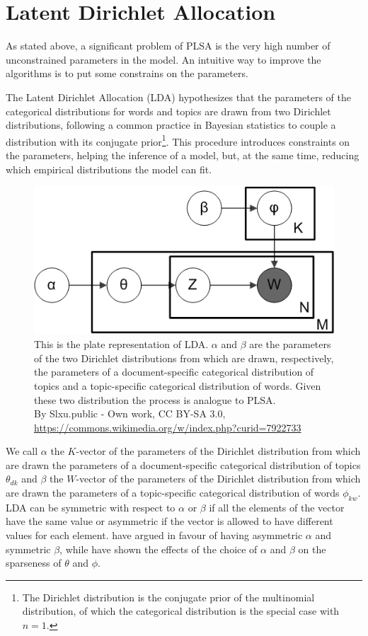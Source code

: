 \documentclass[11pt, a4paper, oneside, openright]{book}
\begin{document}
\section{Latent Dirichlet Allocation}
\label{sec:lda}
As stated above, a significant problem of PLSA is the very high number of unconstrained parameters in the model. An intuitive way to improve the algorithms is to put some constrains on the parameters.

The Latent Dirichlet Allocation (LDA) \parencite{blei2003} hypothesizes that the parameters of the categorical distributions for words and topics are drawn from two Dirichlet distributions, following a common practice in Bayesian statistics to couple a distribution with its conjugate prior\footnote{The Dirichlet distribution is the conjugate prior of the multinomial distribution, of which the categorical distribution is the special case with $n=1$.}. This procedure introduces constraints on the parameters, helping the inference of a model, but, at the same time, reducing which empirical distributions the model can fit.

\begin{figure}[b]
	\centering
	\includegraphics[width=0.5\linewidth]{fig/Smoothed_LDA}
	\caption{This is the plate representation of LDA. $\alpha$ and $\beta$ are the parameters of the two Dirichlet distributions from which are drawn, respectively, the parameters of a document-specific categorical distribution of topics and a topic-specific categorical distribution of words. Given these two distribution the process is analogue to PLSA. \\ By Slxu.public - Own work, CC BY-SA 3.0, \url{https://commons.wikimedia.org/w/index.php?curid=7922733}}
	\label{fig:smoothedlda}
\end{figure}

We call $\alpha$ the $K$-vector of the parameters of the Dirichlet distribution from which are drawn the parameters of a document-specific categorical distribution of topics $\theta_{dk}$ and $\beta$ the $W$-vector of the parameters of the Dirichlet distribution from which are drawn the parameters of a topic-specific categorical distribution of words $\phi_{kw}$. LDA can be symmetric with respect to $\alpha$ or $\beta$ if all the elements of the vector have the same value or asymmetric if the vector is allowed to have different values for each element. \textcite{wallach2009} have argued in favour of having asymmetric $\alpha$ and symmetric $\beta$, while \textcite{shiNewEvaluationFramework2019} have shown the effects of the choice of $\alpha$ and $\beta$ on the sparseness of $\theta$ and $\phi$.
\end{document}

